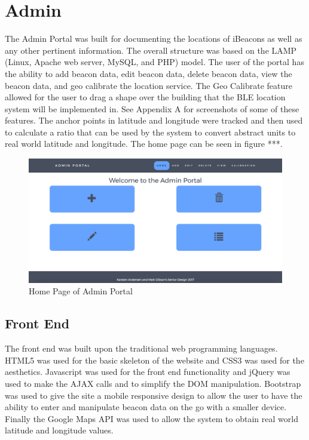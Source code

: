 \section{Admin}
The Admin Portal was built for documenting the locations of iBeacons as well as any other pertinent information. The overall
structure was based on the LAMP (Linux, Apache web server, MySQL, and PHP) model. The user of the portal has the ability to add beacon data, edit beacon data,
delete beacon data, view the beacon data, and geo calibrate the location service. The Geo Calibrate feature allowed for the
user to drag a shape over the building that the BLE location system will be implemented in. See Appendix A for screenshots of some of these features. The anchor points in latitude
and longitude were tracked and then used to calculate a ratio that can be used by the system to convert abstract units to
real world latitude and longitude. The home page can be seen in figure ***.

\begin{figure}[h]
\includegraphics[width=1\textwidth]{images/homeAdmin.png}
\caption{Home Page of Admin Portal}
\end{figure}

\subsection{Front End}
The front end was built upon the traditional web programming languages. HTML5 was used for the basic skeleton of the website
and CSS3 was used for the aesthetics. Javascript was used for the front end functionality and jQuery was used to make the AJAX calls
and to simplify the DOM manipulation. Bootstrap was used to give the site a mobile responsive design to allow the user to have the ability
to enter and manipulate beacon data on the go with a smaller device. Finally the Google Maps API was used to allow the system to obtain
real world latitude and longitude values.

